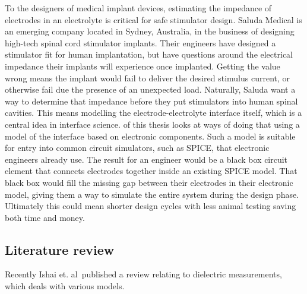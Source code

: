   To the designers of medical implant devices, estimating the impedance of electrodes in an electrolyte is critical for safe stimulator design.
  Saluda Medical is an emerging company located in Sydney, Australia, in the business of designing high-tech spinal cord stimulator implants.
  Their engineers have designed a stimulator fit for human implantation, but have questions around the electrical impedance their implants will experience once implanted.
  Getting the value wrong means the implant would fail to deliver the desired stimulus current, or otherwise fail due the presence of an unexpected load.
  Naturally, Saluda want a way to determine that impedance before they put stimulators into human spinal cavities.
  This means modelling the electrode-electrolyte interface itself, which is a central idea in interface science.
   of this thesis looks at ways of doing that using a model of the interface based on electronic components.
  Such a model is suitable for entry into common circuit simulators, such as SPICE, that electronic engineers already use.
  The result for an engineer would be a black box circuit element that connects electrodes together inside an existing SPICE model.
  That black box would fill the missing gap between their electrodes in their electronic model, giving them a way to simulate the entire system during the design phase.
  Ultimately this could mean shorter design cycles with less animal testing saving both time and money.
  
  \subsection{Literature review}
  
  Recently Ishai et. al\ published a review relating to dielectric measurements, which deals with various models. 

